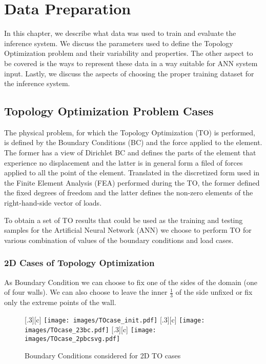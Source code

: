
\chapter{Data Preparation}

In this chapter, we describe what data was used to train and evaluate the inference system.
We discuss the parameters used to define the Topology Optimization problem and their variability and properties.
The other aspect to be covered is the ways to represent these data in a way suitable for ANN system input.
Lastly, we discuss the aspects of choosing the proper training dataset for the inference system.
\medskip

\section{Topology Optimization Problem Cases}

The physical problem, for which the Topology Optimization (TO) is performed, is defined by the Boundary Conditions (BC) and the force applied to the element. 
The former has a view of Dirichlet BC and defines the parts of the element that experience no displacement and the latter is in general form a filed of forces applied to all the point of the element. 
Translated in the discretized form used in the Finite Element Analysis (FEA) performed during the TO, the former defined the fixed degrees of freedom and the latter defines the non-zero elements of the right-hand-side vector of loads.
\medskip

To obtain a set of TO results that could be used as the training and testing samples for the Artificial Neural Network (ANN) we choose to perform TO for various combination of values of the boundary conditions and load cases.
\medskip

\subsection{2D Cases of Topology Optimization}

As Boundary Condition we can choose to fix one of the sides of the domain (one of four walls). 
We can also choose to leave the inner $\frac{1}{3}$ of the side unfixed or fix only the extreme points of the wall. 
\begin{figure}
	\centering
	[.3\linewidth][c]{
		\texttt{[image: images/TOcase\_init.pdf]}}
	[.3\linewidth][c]{
		\texttt{[image: images/TOcase\_23bc.pdf]}}
	[.3\linewidth][c]{
		\texttt{[image: images/TOcase\_2pbcsvg.pdf]}}
	\caption{Boundary Conditions considered for 2D TO cases }
	\label{fig:3bcs}
\end{figure}
\medskip

